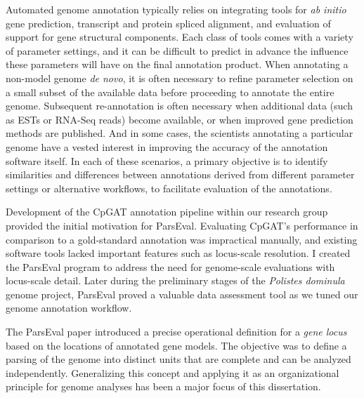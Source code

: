 Automated genome annotation typically relies on integrating tools for \textit{ab initio} gene prediction, transcript and protein spliced alignment, and evaluation of support for gene structural components.
Each class of tools comes with a variety of parameter settings, and it can be difficult to predict in advance the influence these parameters will have on the final annotation product.
When annotating a non-model genome \textit{de novo}, it is often necessary to refine parameter selection on a small subset of the available data before proceeding to annotate the entire genome.
Subsequent re-annotation is often necessary when additional data (such as ESTs or RNA-Seq reads) become available, or when improved gene prediction methods are published.
And in some cases, the scientists annotating a particular genome have a vested interest in improving the accuracy of the annotation software itself.
In each of these scenarios, a primary objective is to identify similarities and differences between annotations derived from different parameter settings or alternative workflows, to facilitate evaluation of the annotations.

Development of the CpGAT annotation pipeline within our research group provided the initial motivation for ParsEval.
Evaluating CpGAT's performance in comparison to a gold-standard annotation was impractical manually, and existing software tools \cite{Keibler,Wang} lacked important features such as locus-scale resolution.
I created the ParsEval program to address the need for genome-scale evaluations with locus-scale detail.
Later during the preliminary stages of the \textit{Polistes dominula} genome project, ParsEval proved a valuable data assessment tool as we tuned our genome annotation workflow.

The ParsEval paper \cite{ParsEval} introduced a precise operational definition for a \textit{gene locus} based on the locations of annotated gene models.
The objective was to define a parsing of the genome into distinct units that are complete and can be analyzed independently.
Generalizing this concept and applying it as an organizational principle for genome analyses has been a major focus of this dissertation.

